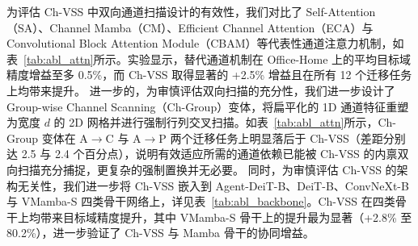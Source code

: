 为评估 Ch-VSS 中双向通道扫描设计的有效性，我们对比了 Self-Attention（SA）、Channel Mamba（CM）、Efficient Channel Attention（ECA）与 Convolutional Block Attention Module（CBAM）等代表性通道注意力机制，如表~\ref{tab:abl_attn}所示。实验显示，替代通道机制在 Office-Home 上的平均目标域精度增益至多 0.5\%，而 Ch-VSS 取得显著的 +2.5\% 增益且在所有 12 个迁移任务上均带来提升。
进一步的，为审慎评估双向扫描的充分性，我们进一步设计了 Group-wise Channel Scanning（Ch-Group）变体，将扁平化的 1D 通道特征重塑为宽度 $d$ 的 2D 网格并进行强制行列交叉扫描。如表~\ref{tab:abl_attn}所示，Ch-Group 变体在 A$\rightarrow$C 与 A$\rightarrow$P 两个迁移任务上明显落后于 Ch-VSS（差距分别达 2.5 与 2.4 个百分点），说明有效适应所需的通道依赖已能被 Ch-VSS 的内禀双向扫描充分捕捉，更复杂的强制置换并无必要。
同时，为审慎评估 Ch-VSS 的架构无关性，我们进一步将 Ch-VSS 嵌入到 Agent-DeiT-B、DeiT-B、ConvNeXt-B 与 VMamba-S 四类骨干网络上，详见表~\ref{tab:abl_backbone}。Ch-VSS 在四类骨干上均带来目标域精度提升，其中 VMamba-S 骨干上的提升最为显著（+2.8\% 至 80.2\%），进一步验证了 Ch-VSS 与 Mamba 骨干的协同增益。

